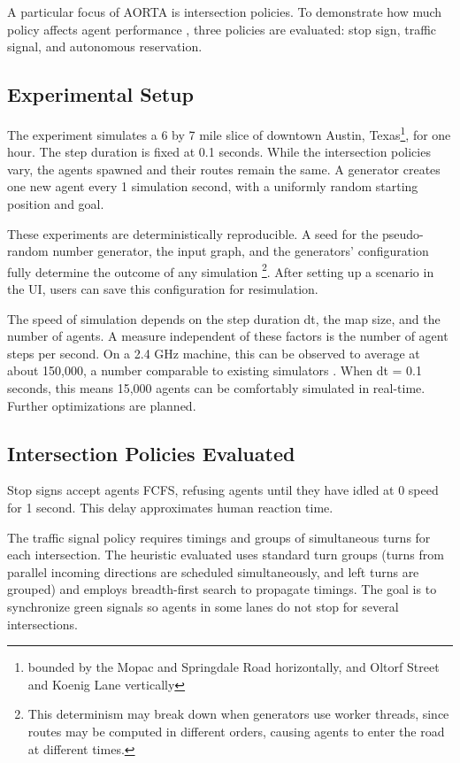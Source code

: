 \documentclass[letterpaper, 10 pt, conference]{ieeeconf}  %
\begin{document}
A particular focus of AORTA is intersection policies. To demonstrate how much
policy affects agent performance , three policies are evaluated: stop sign,
traffic signal, and autonomous reservation.

\subsection{Experimental Setup}

The experiment simulates a 6 by 7 mile slice of downtown Austin,
Texas\footnote{bounded by the Mopac and Springdale Road horizontally, and Oltorf
Street and Koenig Lane vertically}, for one hour. The step duration is fixed at
0.1 seconds. While the intersection policies vary, the agents spawned and their
routes remain the same. A generator creates one new agent every 1 simulation
second, with a uniformly random starting position and goal.

These experiments are deterministically reproducible. A seed for the
pseudo-random number generator, the input graph, and the generators'
configuration fully determine the outcome of any simulation \footnote{This
  determinism may break down when generators use worker threads, since routes
  may be computed in different orders, causing agents to enter the road at
different times.}. After setting up a scenario in the UI, users can save this
configuration for resimulation.

The speed of simulation depends on the step duration dt, the map size, and the
number of agents. A measure independent of these factors is the number of agent
steps per second. On a 2.4 GHz machine, this can be observed to average at about
150,000, a number comparable to existing simulators \cite{SUMOthesis}. When dt
= 0.1 seconds, this means 15,000 agents can be comfortably simulated in
real-time. Further optimizations are planned.

\subsection{Intersection Policies Evaluated}

Stop signs accept agents FCFS, refusing agents until they have idled at 0 speed
for 1 second. This delay approximates human reaction time.

The traffic signal policy requires timings and groups of simultaneous turns for
each intersection. The heuristic evaluated uses standard turn groups (turns from
parallel incoming directions are scheduled simultaneously, and left turns are
grouped) and employs breadth-first search to propagate timings. The goal is to
synchronize green signals so agents in some lanes do not stop for several
intersections.
\end{document}

